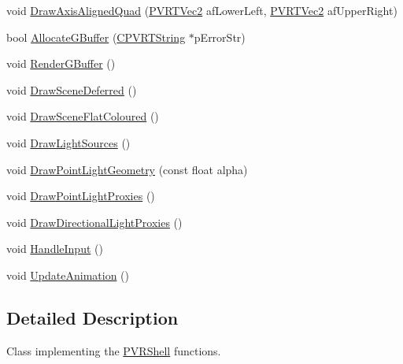 \begin{DoxyCompactItemize}
void \hyperlink{class_o_g_l_e_s3_deferred_shading_a2b6d1ea3db9ba962d467677a2d9a6f97}{Draw\+Axis\+Aligned\+Quad} (\hyperlink{struct_p_v_r_t_vec2}{P\+V\+R\+T\+Vec2} af\+Lower\+Left, \hyperlink{struct_p_v_r_t_vec2}{P\+V\+R\+T\+Vec2} af\+Upper\+Right)
\item 
bool \hyperlink{class_o_g_l_e_s3_deferred_shading_a875c0099681d4f62cbde00084a878047}{Allocate\+G\+Buffer} (\hyperlink{class_c_p_v_r_t_string}{C\+P\+V\+R\+T\+String} $\ast$p\+Error\+Str)
\item 
void \hyperlink{class_o_g_l_e_s3_deferred_shading_a9851ba15dfcf20a0d552f3442bf44559}{Render\+G\+Buffer} ()
\item 
void \hyperlink{class_o_g_l_e_s3_deferred_shading_a03821dff6912b1945d245427658e37f6}{Draw\+Scene\+Deferred} ()
\item 
void \hyperlink{class_o_g_l_e_s3_deferred_shading_aed0e5eb7004a02caf6c689eb137ac9de}{Draw\+Scene\+Flat\+Coloured} ()
\item 
void \hyperlink{class_o_g_l_e_s3_deferred_shading_afd96cceb55bf2374735caad123bc3656}{Draw\+Light\+Sources} ()
\item 
void \hyperlink{class_o_g_l_e_s3_deferred_shading_acf9875fc26bc20d2dd20b3af4f439fda}{Draw\+Point\+Light\+Geometry} (const float alpha)
\item 
void \hyperlink{class_o_g_l_e_s3_deferred_shading_a9a3bb8036cda4cd934815899f05b9a96}{Draw\+Point\+Light\+Proxies} ()
\item 
void \hyperlink{class_o_g_l_e_s3_deferred_shading_a1cce35f31e6f539af4ea9847c42f14f0}{Draw\+Directional\+Light\+Proxies} ()
\item 
void \hyperlink{class_o_g_l_e_s3_deferred_shading_a58c1103b44115ef57bea80996962c3b6}{Handle\+Input} ()
\item 
void \hyperlink{class_o_g_l_e_s3_deferred_shading_af37bbf48a2d9bd594354f6f15efbb728}{Update\+Animation} ()
\end{DoxyCompactItemize}


\subsection{Detailed Description}


 Class implementing the \hyperlink{class_p_v_r_shell}{P\+V\+R\+Shell} functions. 

